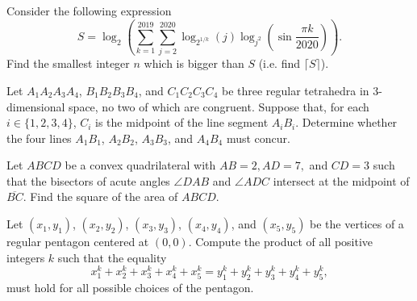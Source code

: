 \begin{question}[name={2021 PUMaC, Algebra, \href{https://artofproblemsolving.com/community/c4p25094356}{Problem 7}}]
	Consider the following expression
	$$S = \log_2 \left( \sum^{2019}_{k=1}\sum^{2020}_{j=2}\log_{2^{1/k}} (j) \log_{j^2} \left(\sin \frac{\pi k}{2020}\right) \right).$$Find the smallest integer $n$ which is bigger than $S$ (i.e. find $\lceil S \rceil$).
\end{question}





\begin{question}[name={2021 HMIC, \href{https://artofproblemsolving.com/community/c4p21784605}{Problem 4}}]
	Let $A_1A_2A_3A_4$, $B_1B_2B_3B_4$, and $C_1C_2C_3C_4$ be three regular tetrahedra in $3$-dimensional space, no two of which are congruent. Suppose that, for each $i\in \{1,2,3,4\}$, $C_i$ is the midpoint of the line segment $A_iB_i$. Determine whether the four lines $A_1B_1$, $A_2B_2$, $A_3B_3$, and $A_4B_4$ must concur.
\end{question}



%	








\begin{question}[name={2022 AIME II, \href{https://artofproblemsolving.com/community/c4p24447159}{Problem 11}}]
	Let $ABCD$ be a convex quadrilateral with $AB=2, AD=7,$ and $CD=3$ such that the bisectors of acute angles $\angle{DAB}$ and $\angle{ADC}$ intersect at the midpoint of $\overline{BC}.$ Find the square of the area of $ABCD$.
\end{question}


%	














\begin{question}[name={2022 HMMT, Algebra \& Number Theory, \href{https://artofproblemsolving.com/community/c4p24651727}{Problem 7}}]
	Let $(x_1, y_1)$, $(x_2, y_2)$, $(x_3, y_3)$, $(x_4, y_4)$, and $(x_5, y_5)$ be the vertices of a regular pentagon centered at $(0, 0)$. Compute the product of all positive integers $k$ such that the equality $$x_1^k+x_2^k+x_3^k+x_4^k+x_5^k=y_1^k+y_2^k+y_3^k+y_4^k+y_5^k,$$ must hold for all possible choices of the pentagon.
\end{question}


